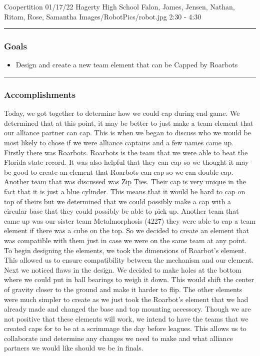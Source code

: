 \insertmeeting 
  {Coopertition} 
  {01/17/22} 
  {Hagerty High School}
  {Falon, James, Jensen, Nathan, Ritam, Rose, Samantha}
  {Images/RobotPics/robot.jpg}
  {2:30 - 4:30}
  
\noindent\hfil\rule{\textwidth}{.4pt}\hfil
\subsubsection*{Goals}
\begin{itemize}
    \item Design and create a new team element that can be Capped by Roarbots  

\end{itemize} 

\noindent\hfil\rule{\textwidth}{.4pt}\hfil

\subsubsection*{Accomplishments}
Today, we got together to determine how we could cap during end game. We determined that at this point, it may be better to just make a team element that our alliance partner can cap. This is when we began to discuss who we would be most likely to chose if we were alliance captains and a few names came up. Firstly there was Roarbots. Roarbots is the team that we were able to beat the Florida state record. It was also helpful that they can cap so we thought it may be good to create an element that Roarbots can cap so we can double cap. Another team that was discussed was Zip Ties. Their cap is very unique in the fact that it is just a blue cylinder. This means that it would be hard to cap on top of theirs but we determined that we could possibly make a cap with a circular base that they could possibly be able to pick up. Another team that came up was our sister team Metalmorphosis (4227) they were able to cap a team element if there was a cube on the top. So we decided to create an element that was compatible with them just in case we were on the same team at any point.
To begin designing the elements, we took the dimensions of Roarbot's element. This allowed us to ensure compatibility between the mechanism and our element. Next we noticed flaws in the design. We decided to make holes at the bottom where we could put in ball bearings to weigh it down. This would shift the center of gravity closer to the ground and make it harder to flip.
The other elements were much simpler to create as we just took the Roarbot's element that we had already made and changed the base and top mounting accessory. Though we are not positive that these elements will work, we intend to have the teams that we created caps for to be at a scrimmage the day before leagues. This allows us to collaborate and determine any changes we need to make and what alliance partners we would like should we be in finals.
 

